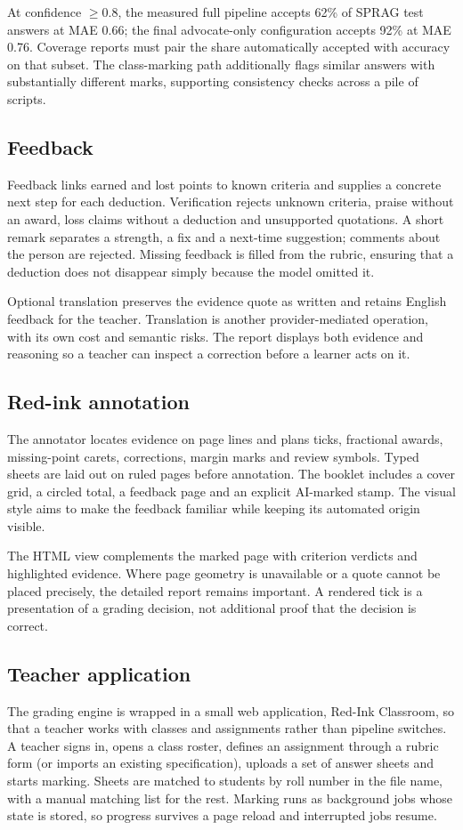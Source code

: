 At confidence $\geq 0.8$, the measured full pipeline accepts 62\% of SPRAG test answers at MAE 0.66; the final advocate-only configuration accepts 92\% at MAE 0.76. Coverage reports must pair the share automatically accepted with accuracy on that subset. The class-marking path additionally flags similar answers with substantially different marks, supporting consistency checks across a pile of scripts.

\subsection{Feedback}
Feedback links earned and lost points to known criteria and supplies a concrete next step for each deduction. Verification rejects unknown criteria, praise without an award, loss claims without a deduction and unsupported quotations. A short remark separates a strength, a fix and a next-time suggestion; comments about the person are rejected. Missing feedback is filled from the rubric, ensuring that a deduction does not disappear simply because the model omitted it.

Optional translation preserves the evidence quote as written and retains English feedback for the teacher. Translation is another provider-mediated operation, with its own cost and semantic risks. The report displays both evidence and reasoning so a teacher can inspect a correction before a learner acts on it.

\subsection{Red-ink annotation}
The annotator locates evidence on page lines and plans ticks, fractional awards, missing-point carets, corrections, margin marks and review symbols. Typed sheets are laid out on ruled pages before annotation. The booklet includes a cover grid, a circled total, a feedback page and an explicit AI-marked stamp. The visual style aims to make the feedback familiar while keeping its automated origin visible.

The HTML view complements the marked page with criterion verdicts and highlighted evidence. Where page geometry is unavailable or a quote cannot be placed precisely, the detailed report remains important. A rendered tick is a presentation of a grading decision, not additional proof that the decision is correct.

\subsection{Teacher application}
The grading engine is wrapped in a small web application, Red-Ink Classroom, so that a teacher works with classes and assignments rather than pipeline switches. A teacher signs in, opens a class roster, defines an assignment through a rubric form (or imports an existing specification), uploads a set of answer sheets and starts marking. Sheets are matched to students by roll number in the file name, with a manual matching list for the rest. Marking runs as background jobs whose state is stored, so progress survives a page reload and interrupted jobs resume.

